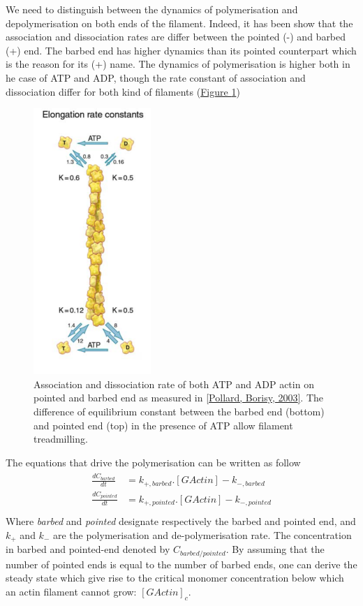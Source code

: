 \documentclass[A4paperpaper,11pt,english]{sphinxmanual}
\begin{document}
We need to distinguish between the dynamics of polymerisation and
depolymerisation on both ends of the filament. Indeed, it has been show that the
association and dissociation rates are differ between the pointed (-) and
barbed (+) end. The barbed end has  higher dynamics than its pointed
counterpart which is the reason for its (+) name. The dynamics of
polymerisation is higher both in he case of ATP and ADP, though the rate
constant of association and dissociation differ for both kind of filaments (\hyperref[index-latex:fig-actin-pollard]{Figure  \ref*{index-latex:fig-actin-pollard}})
\begin{figure}[htbp]
\centering
\capstart

\includegraphics[width=0.250\linewidth]{elongation-rate-constant.png}
\caption{Association and dissociation rate of both ATP and ADP actin on pointed and
barbed end as measured in {\hyperref[index-latex:pollard2003]{{[}Pollard, Borisy,  2003{]}}}. The difference of
equilibrium constant between the barbed end (bottom) and pointed end (top) in the presence of ATP
allow filament treadmilling.}\label{index-latex:fig-actin-pollard}\end{figure}

The equations that drive the polymerisation can be written as follow
\label{index-latex:equation-roa1}\begin{gather}
\begin{split}\frac{dC_{barbed}}{dt} &= k_{+,{barbed}}.[GActin] - k_{-,{barbed}} \\
\frac{dC_{pointed}}{dt} &= k_{+,{pointed}}.[GActin] - k_{-,{pointed}} \\\end{split}\label{index-latex-roa1}
\end{gather}
Where \emph{barbed} and \emph{pointed} designate respectively the barbed and pointed end,
and \(k_+\) and \(k_-\) are the polymerisation and de-polymerisation
rate.  The concentration in barbed and pointed-end denoted by
\(C_{{barbed}/{pointed}}\). By assuming that the number of pointed ends is
equal to the number of barbed ends, one can derive the steady state which give
rise to the critical monomer concentration below which an actin filament cannot
grow: \([GActin]_c\).
\end{document}
